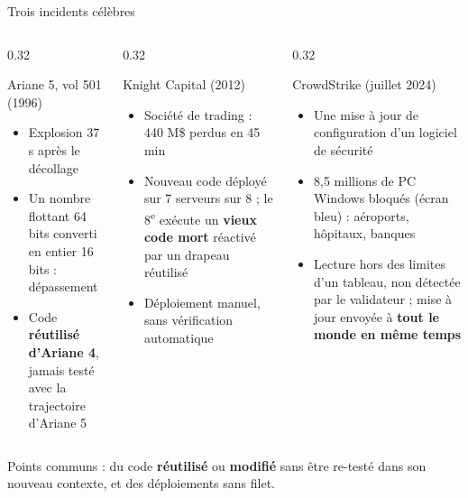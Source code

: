 \documentclass[aspectratio=169,10pt]{beamer}
\begin{document}
\begin{frame}{Trois incidents célèbres}
  \begin{columns}[T]
    \begin{column}{0.32\textwidth}
      \begin{block}{Ariane 5, vol 501 (1996)}
        \footnotesize
        \begin{itemize}
          \item Explosion 37 s après le décollage
          \item Un nombre flottant 64 bits converti en entier 16 bits : \alert{dépassement}
          \item Code \textbf{réutilisé d'Ariane 4}, jamais testé avec la trajectoire d'Ariane 5
        \end{itemize}
      \end{block}
    \end{column}
    \begin{column}{0.32\textwidth}
      \begin{block}{Knight Capital (2012)}
        \footnotesize
        \begin{itemize}
          \item Société de trading : \alert{440 M\$ perdus en 45 min}
          \item Nouveau code déployé sur 7 serveurs sur 8 ; le 8\textsuperscript{e} exécute un \textbf{vieux code mort} réactivé par un drapeau réutilisé
          \item Déploiement manuel, sans vérification automatique
        \end{itemize}
      \end{block}
    \end{column}
    \begin{column}{0.32\textwidth}
      \begin{block}{CrowdStrike (juillet 2024)}
        \footnotesize
        \begin{itemize}
          \item Une mise à jour de configuration d'un logiciel de sécurité
          \item \alert{8,5 millions de PC Windows} bloqués (écran bleu) : aéroports, hôpitaux, banques
          \item Lecture hors des limites d'un tableau, non détectée par le validateur ; mise à jour envoyée à \textbf{tout le monde en même temps}
        \end{itemize}
      \end{block}
    \end{column}
  \end{columns}
  \vspace{3mm}
  \begin{center}
    \small Points communs : du code \textbf{réutilisé} ou \textbf{modifié} sans être re-testé dans son nouveau contexte, et des déploiements sans filet.
  \end{center}
\end{frame}
\end{document}
